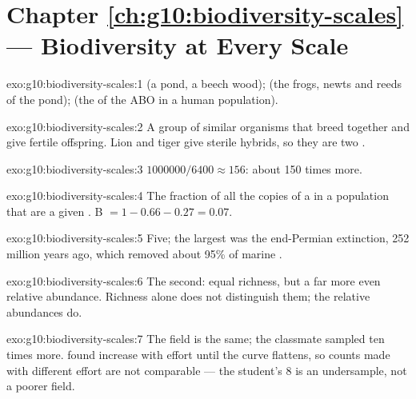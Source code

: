 \section*{Chapter \ref{ch:g10:biodiversity-scales} --- Biodiversity at Every Scale}

\begin{solution}{exo:g10:biodiversity-scales:1}
 (a pond, a beech wood);  (the frogs, newts and reeds
of the pond);  (the  of the ABO  in a human
population).
\end{solution}

\begin{solution}{exo:g10:biodiversity-scales:2}
A group of similar organisms that breed together and give fertile
offspring. Lion and tiger give sterile hybrids, so they are two
.
\end{solution}

\begin{solution}{exo:g10:biodiversity-scales:3}
$\num{1000000}/6400 \approx 156$: about 150 times more.
\end{solution}

\begin{solution}{exo:g10:biodiversity-scales:4}
The fraction of all the copies of a  in a population that are a
given . B $= 1 - 0.66 - 0.27 = 0.07$.
\end{solution}

\begin{solution}{exo:g10:biodiversity-scales:5}
Five; the largest was the end-Permian extinction, 252 million years
ago, which removed about 95\% of marine .
\end{solution}

\begin{solution}{exo:g10:biodiversity-scales:6}
The second: equal richness, but a far more even relative abundance.
Richness alone does not distinguish them; the relative abundances do.
\end{solution}

\begin{solution}{exo:g10:biodiversity-scales:7}
The field is the same; the classmate sampled ten times more. 
found increase with effort until the curve flattens, so counts made
with different effort are not comparable --- the student's 8 is an
undersample, not a poorer field.
\end{solution}

